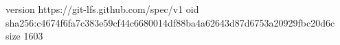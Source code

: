 version https://git-lfs.github.com/spec/v1
oid sha256:c4674f6fa7c383e59cf44c6680014df88ba4a62643d87d6753a20929fbc20d6c
size 1603
